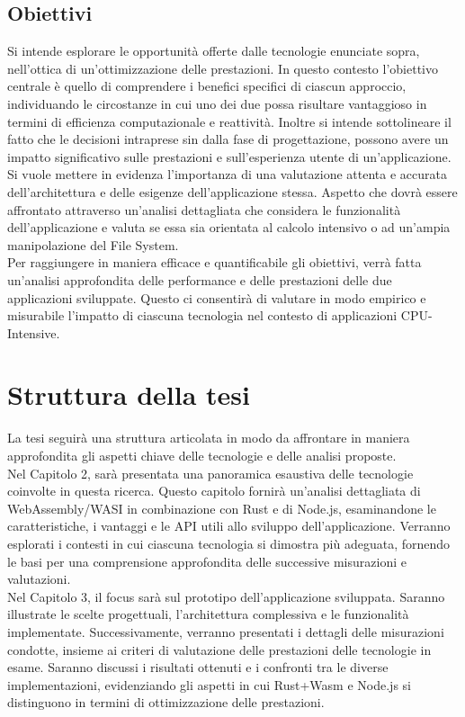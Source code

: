 \subsection{Obiettivi}
Si intende esplorare le opportunità offerte dalle tecnologie enunciate sopra, nell'ottica di un'ottimizzazione delle prestazioni.
In questo contesto l'obiettivo centrale è quello di comprendere i benefici specifici di ciascun approccio, individuando le circostanze in cui uno dei due possa risultare vantaggioso in termini di efficienza computazionale e reattività. 
Inoltre si intende sottolineare il fatto che le decisioni intraprese sin dalla fase di progettazione, possono avere un impatto significativo sulle prestazioni e sull'esperienza utente di un'applicazione.
Si vuole mettere in evidenza l'importanza di una valutazione attenta e accurata dell'architettura e delle esigenze dell'applicazione stessa.
Aspetto che dovrà essere affrontato attraverso un'analisi dettagliata che considera le funzionalità dell'applicazione e valuta se essa sia orientata al calcolo intensivo o ad un'ampia manipolazione del File System.
\\Per raggiungere in maniera efficace e quantificabile gli obiettivi, verrà fatta un'analisi approfondita delle performance e delle prestazioni delle due applicazioni sviluppate.
Questo ci consentirà di valutare in modo empirico e misurabile l'impatto di ciascuna tecnologia nel contesto di applicazioni CPU-Intensive.
\newpage

\section{Struttura della tesi}
\label{sec:struttura}
La tesi seguirà una struttura articolata in modo da affrontare in maniera approfondita gli aspetti chiave delle tecnologie e delle analisi proposte.
\\Nel Capitolo 2, sarà presentata una panoramica esaustiva delle tecnologie coinvolte in questa ricerca. Questo capitolo fornirà un'analisi dettagliata di WebAssembly/WASI in combinazione con Rust e di Node.js, esaminandone le caratteristiche, i vantaggi e le API utili allo sviluppo dell'applicazione.
Verranno esplorati i contesti in cui ciascuna tecnologia si dimostra più adeguata, fornendo le basi per una comprensione approfondita delle successive misurazioni e valutazioni.
\\Nel Capitolo 3, il focus sarà sul prototipo dell'applicazione sviluppata. Saranno illustrate le scelte progettuali, l'architettura complessiva e le funzionalità implementate.
Successivamente, verranno presentati i dettagli delle misurazioni condotte, insieme ai criteri di valutazione delle prestazioni delle tecnologie in esame. 
Saranno discussi i risultati ottenuti e i confronti tra le diverse implementazioni, evidenziando gli aspetti in cui Rust+Wasm e Node.js si distinguono in termini di ottimizzazione delle prestazioni.


